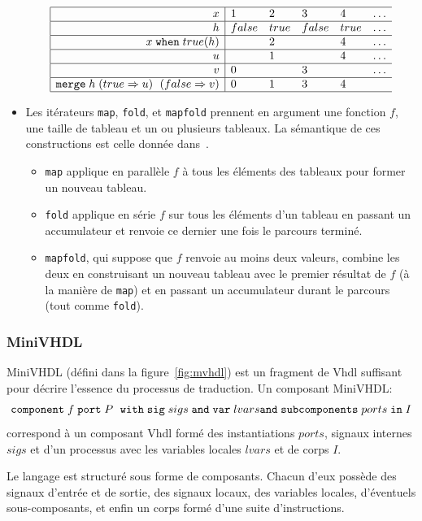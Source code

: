 \documentclass[a4paper]{article}
\newcommand{\minivhdl}{{\sc MiniVHDL}}
\newcommand{\vhdl}{{\sc Vhdl}}
\newcommand{\mybox}[1]{\mbox{\tt{#1}}}
\newcommand{\When}[3]{#1 \; \mybox{when} \; #2(#3)}
\newcommand{\Merges}[5]{\mybox{merge} \; #1 \; (#2 \Rightarrow #3) \; \
  (#4 \Rightarrow #5)}
\newcommand{\Component}[6]{\mybox{component} \; #1 \; \mybox{port} \; #2 \; \
  \mybox{with} \; \mybox{sig} \; #3 \; \mybox{and} \; \mybox{var} \; #4 \; \\
  \mybox{and} \; \mybox{subcomponents} \; #5 \; \mybox{in} \; #6}
\begin{document}
\begin{itemize}
\[
\begin{array}{|r|llllllllllllllllllllllllllll}
  \hline
  x & 1 & 2 & 3 & 4 & \dots \\
  \hline
  h & false & true & false & true & \dots \\
  \hline
  \When{x}{true}{h} & & 2 & & 4 & \dots \\
  \hline
  u &  & 1 & & 4 & \dots \\
  \hline
  v & 0 & & 3 & & \dots \\
  \hline
  \Merges{h}{true}{u}{false}{v} & 0 & 1 & 3 & 4 \\
  \hline
\end{array}
\]

\item
Les it\'erateurs \texttt{map}, \texttt{fold}, et \texttt{mapfold}
prennent en argument une fonction $f$, une taille de tableau et un ou
plusieurs tableaux. La s\'emantique de ces constructions est celle
donn\'ee dans~\cite{lucy:genie00,morel-07-jes}.

\begin{itemize}
\item \texttt{map} applique en parall\`ele $f$ \`a tous les \'el\'ements des tableaux
  pour former un nouveau tableau.
\item \texttt{fold} applique en s\'erie $f$ sur tous les \'el\'ements d'un tableau en
  passant un accumulateur et renvoie ce dernier une fois le parcours termin\'e.
\item \texttt{mapfold}, qui suppose que $f$ renvoie au moins deux valeurs,
  combine les deux en construisant un nouveau tableau avec le premier r\'esultat
  de $f$ (\`a la mani\`ere de \texttt{map}) et en passant un accumulateur durant le
  parcours (tout comme \texttt{fold}).
\end{itemize}
\end{itemize}

\subsubsection{MiniVHDL}

\minivhdl{} (d\'efini dans la figure~\ref{fig:mvhdl})
est un fragment de \vhdl{} suffisant pour
d\'ecrire l'essence du processus de traduction. Un composant \minivhdl:
\[
\Component{f}{P}{sigs}{lvars}{ports}{I}
\]
correspond \`a un
composant \vhdl{} form\'e des instantiations $ports$, signaux internes $sigs$ et d'un
processus avec les variables locales $lvars$ et de corps $I$.

Le langage est structur\'e sous forme de composants. Chacun d'eux poss\`ede des
signaux d'entr\'ee et de sortie, des signaux locaux, des variables locales, d'\'eventuels
sous-composants, et enfin un corps form\'e d'une suite d'instructions.
\end{document}
